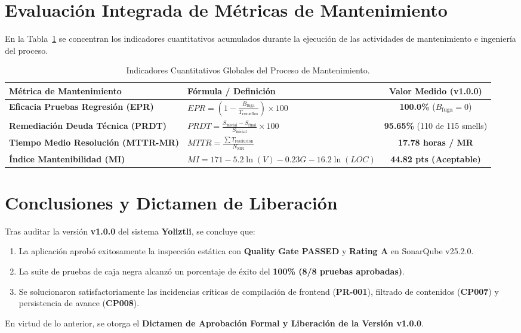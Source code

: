 \documentclass[12pt]{article}
\begin{document}
\newpage
\section{Evaluación Integrada de Métricas de Mantenimiento}

En la Tabla~\ref{tab:maintenance_metrics} se concentran los indicadores cuantitativos acumulados durante la ejecución de las actividades de mantenimiento e ingeniería del proceso.

\begin{table}[H]
    \centering
    \caption{Indicadores Cuantitativos Globales del Proceso de Mantenimiento.}
    \label{tab:maintenance_metrics}
    \small
    \color{black}
    \begin{tabularx}{\textwidth}{XXc}
        \toprule
        \textbf{Métrica de Mantenimiento} & \textbf{Fórmula / Definición} & \textbf{Valor Medido (v1.0.0)} \\
        \midrule
        \textbf{Eficacia Pruebas Regresión (EPR)} & $EPR = \left(1 - \frac{B_{\text{fuga}}}{T_{\text{resueltos}}}\right) \times 100$ & \textbf{100.0\%} ($B_{\text{fuga}} = 0$) \\
        \rowcolor{darkcard}
        \textbf{Remediación Deuda Técnica (PRDT)} & $PRDT = \frac{S_{\text{inicial}} - S_{\text{final}}}{S_{\text{inicial}}} \times 100$ & \textbf{95.65\%} (110 de 115 smells) \\
        \textbf{Tiempo Medio Resolución (MTTR-MR)} & $MTTR = \frac{\sum T_{\text{resolución}}}{N_{\text{MR}}}$ & \textbf{17.78 horas / MR} \\
        \rowcolor{darkcard}
        \textbf{Índice Mantenibilidad (MI)} & $MI = 171 - 5.2 \ln(V) - 0.23 G - 16.2 \ln(LOC)$ & \textbf{44.82 pts (Aceptable)} \\
        \bottomrule
    \end{tabularx}
\end{table}

\newpage
\section{Conclusiones y Dictamen de Liberación}

Tras auditar la versión \textbf{v1.0.0} del sistema \textbf{Yoliztli}, se concluye que:
\begin{enumerate}
    \item La aplicación aprobó exitosamente la inspección estática con \textbf{Quality Gate PASSED} y \textbf{Rating A} en SonarQube v25.2.0.
    \item La suite de pruebas de caja negra alcanzó un porcentaje de éxito del \textbf{100\% (8/8 pruebas aprobadas)}.
    \item Se solucionaron satisfactoriamente las incidencias críticas de compilación de frontend (\textbf{PR-001}), filtrado de contenidos (\textbf{CP007}) y persistencia de avance (\textbf{CP008}).
\end{enumerate}

En virtud de lo anterior, se otorga el \textbf{Dictamen de Aprobación Formal y Liberación de la Versión v1.0.0}.
\end{document}
